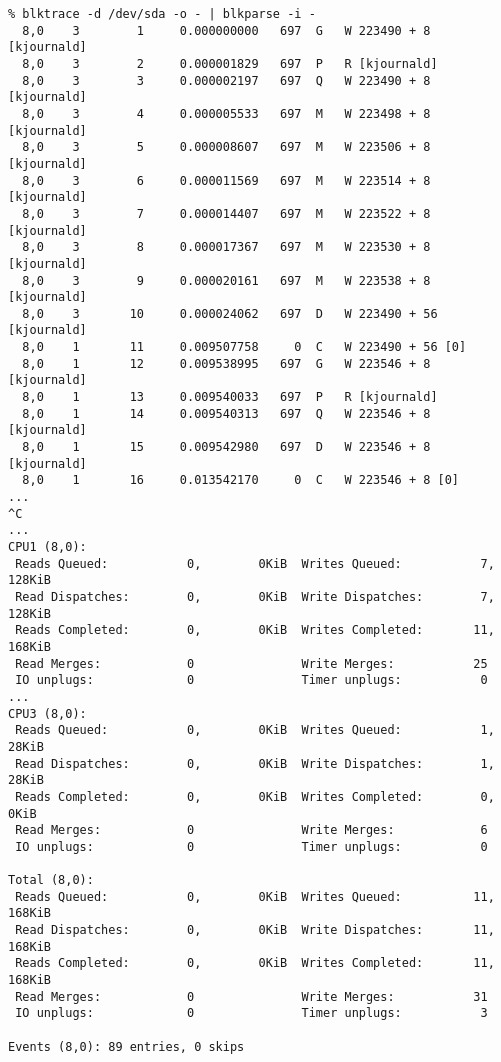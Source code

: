 \documentclass{article}
\begin{document}
\begin{verbatim}
% blktrace -d /dev/sda -o - | blkparse -i -
  8,0    3        1     0.000000000   697  G   W 223490 + 8 [kjournald]
  8,0    3        2     0.000001829   697  P   R [kjournald]
  8,0    3        3     0.000002197   697  Q   W 223490 + 8 [kjournald]
  8,0    3        4     0.000005533   697  M   W 223498 + 8 [kjournald]
  8,0    3        5     0.000008607   697  M   W 223506 + 8 [kjournald]
  8,0    3        6     0.000011569   697  M   W 223514 + 8 [kjournald]
  8,0    3        7     0.000014407   697  M   W 223522 + 8 [kjournald]
  8,0    3        8     0.000017367   697  M   W 223530 + 8 [kjournald]
  8,0    3        9     0.000020161   697  M   W 223538 + 8 [kjournald]
  8,0    3       10     0.000024062   697  D   W 223490 + 56 [kjournald]
  8,0    1       11     0.009507758     0  C   W 223490 + 56 [0]
  8,0    1       12     0.009538995   697  G   W 223546 + 8 [kjournald]
  8,0    1       13     0.009540033   697  P   R [kjournald]
  8,0    1       14     0.009540313   697  Q   W 223546 + 8 [kjournald]
  8,0    1       15     0.009542980   697  D   W 223546 + 8 [kjournald]
  8,0    1       16     0.013542170     0  C   W 223546 + 8 [0]
...
^C
...
CPU1 (8,0):
 Reads Queued:           0,        0KiB  Writes Queued:           7,      128KiB
 Read Dispatches:        0,        0KiB  Write Dispatches:        7,      128KiB
 Reads Completed:        0,        0KiB  Writes Completed:       11,      168KiB
 Read Merges:            0               Write Merges:           25
 IO unplugs:             0               Timer unplugs:           0
...
CPU3 (8,0):
 Reads Queued:           0,        0KiB  Writes Queued:           1,       28KiB
 Read Dispatches:        0,        0KiB  Write Dispatches:        1,       28KiB
 Reads Completed:        0,        0KiB  Writes Completed:        0,        0KiB
 Read Merges:            0               Write Merges:            6
 IO unplugs:             0               Timer unplugs:           0

Total (8,0):
 Reads Queued:           0,        0KiB  Writes Queued:          11,      168KiB
 Read Dispatches:        0,        0KiB  Write Dispatches:       11,      168KiB
 Reads Completed:        0,        0KiB  Writes Completed:       11,      168KiB
 Read Merges:            0               Write Merges:           31
 IO unplugs:             0               Timer unplugs:           3

Events (8,0): 89 entries, 0 skips
\end{verbatim}
\end{document}
